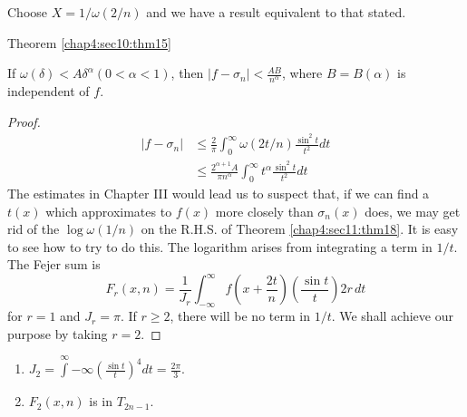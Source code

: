 Choose $X = 1/ \omega (2/n)$ and we have a result equivalent to that stated.

\setcounter{corollary}{0}
\begin{corollary}\label{chap4:sec11:coro1} %
  Theorem \ref{chap4:sec10:thm15}\pageoriginale
\end{corollary}

\begin{corollary}\label{chap4:sec11:coro2} %
  If $\omega (\delta) < A \delta^{\alpha} (0 < \alpha <1)$, then $| f
  - \sigma_n| < \frac{AB}{n^{\alpha}}$, where $B = B(\alpha)$ is
  independent of $f$. 
\end{corollary}

\begin{proof}
  \begin{align*}
    | f - \sigma_n| & \leq \frac{2}{\pi} \int^{\infty}_0 \omega (2t/n)
    \frac{\sin^2 t}{t^2} dt\\ 
    & \leq \frac{2^{\alpha + 1}A}{\pi n^{\alpha}} \int^{\infty}_0
    t^{\alpha} \frac{\sin^2 t}{t^2} dt  
  \end{align*}
  The estimates in Chapter III would lead us to suspect that, if we
  can find a $t(x)$ which approximates to $f(x)$ more closely than
  $\sigma_n (x)$ does, we may get rid of the $\log \omega (1/n)$ on the
  R.H.S. of Theorem \ref{chap4:sec11:thm18}. It is easy to see how to try to do this. The
  logarithm arises from integrating a term in $1/t$. The Fejer sum is  
  $$
  F_r(x,n) = \frac{1}{J_r} \int^{\infty}_{-\infty} f \left(x+ \frac{2t}{n}\right)
  \left(\frac{\sin t}{t}\right)2r\, dt 
  $$
  for $r=1$ and $J_r = \pi$. If $r \geq 2$, there will be no term in $1/t$.  
  We shall achieve our purpose by taking $r=2$.
\end{proof}

\setcounter{lem}{0}
\begin{lemma}\label{chap4:sec11:lem1} %
  \begin{enumerate}[(1)]
  \item $J_2 = \int \limits^{\infty}{-\infty} \left(\frac{\sin t}{t}\right)^4  dt
    = \frac{2 \pi}{3}$.\\ 
  \item $F_2(x,n) $ is in $T_{2n -1}$.
  \end{enumerate}
\end{lemma}

